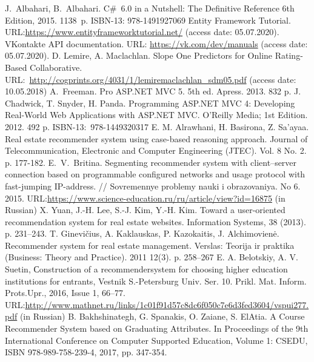 \documentclass[conference,a4]{IEEEtran}
\begin{document}
\begin{thebibliography}{99}
 J.~Albahari, B.~Albahari. C\#~6.0 in a Nutshell: The Definitive Reference 6th Edition, 2015. 1138~p. ISBN-13: 978-1491927069
Entity Framework Tutorial. URL:\url{https://www.entityframeworktutorial.net/} (access date: 05.07.2020).
VKontakte API documentation. URL: \url{https://vk.com/dev/manuals} (access date: 05.07.2020).
 D. Lemire, A. Maclachlan. Slope One Predictors for Online Rating-Based Collaborative. URL:~\url{http://cogprints.org/4031/1/lemiremaclachlan_sdm05.pdf} (access date: 10.05.2018)
A.~Freeman. Pro ASP.NET MVC 5. 5th ed. Apress. 2013. 832 p. 
 J. Chadwick, T. Snyder, H. Panda. Programming ASP.NET MVC 4: Developing Real-World Web Applications with ASP.NET MVC.  O'Reilly Media; 1st Edition. 2012. 492 p.  ISBN-13:~978-1449320317
E. M. Alrawhani, H. Basirona, Z. Sa’ayaa. Real estate recommender system using case-based reasoning approach. Journal of
Telecommunication, Electronic and Computer Engineering (JTEC).
Vol. 8 No. 2. p. 177-182.
 E.~V.~Britina. Segmenting recommender system with client--server connection based on programmable configured networks and usage protocol with fast-jumping IP-address.  // Sovremennye problemy nauki i obrazovaniya. No 6. 2015.
URL:\url{https://www.science-education.ru/ru/article/view?id=16875} (in Russian)
 X. Yuan, J.-H. Lee, S.-J. Kim, Y.-H. Kim. Toward a user-oriented recommendation system for real estate websites. Information Systems, 38 (2013). p. 231–243.
T. Ginevičius, A. Kaklauskas, P. Kazokaitis, J. Alchimovienė.
Recommender system for real estate management. Verslas: Teorija ir
praktika (Business: Theory and Practice). 2011 12(3). p. 258–267 
 E. A. Belotskiy, A. V. Suetin, Сonstruction of a recommendersystem for choosing higher education institutions for entrants, Vestnik S.-Petersburg Univ. Ser. 10. Prikl. Mat. Inform. Prots.Upr., 2016, Issue 1, 66–77. URL:\url{http://www.mathnet.ru/links/1c01f91d57c8dc6f050c7e6d3fed3604/vspui277.pdf} (in Russian)
B. Bakhshinategh, G. Spanakis, O. Zaiane, S. ElAtia. A Course Recommender System based on Graduating Attributes. In Proceedings of the 9th International Conference on Computer Supported Education, Volume 1: CSEDU, ISBN 978-989-758-239-4, 2017, pp. 347-354. 

\end{thebibliography}
\end{document}
